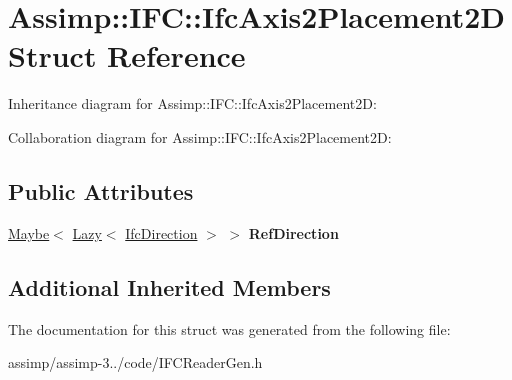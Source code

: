 \hypertarget{struct_assimp_1_1_i_f_c_1_1_ifc_axis2_placement2_d}{\section{Assimp\+:\+:I\+F\+C\+:\+:Ifc\+Axis2\+Placement2\+D Struct Reference}
\label{struct_assimp_1_1_i_f_c_1_1_ifc_axis2_placement2_d}
}


Inheritance diagram for Assimp\+:\+:I\+F\+C\+:\+:Ifc\+Axis2\+Placement2\+D\+:


Collaboration diagram for Assimp\+:\+:I\+F\+C\+:\+:Ifc\+Axis2\+Placement2\+D\+:
\subsection*{Public Attributes}
\begin{DoxyCompactItemize}
\item 
\hypertarget{struct_assimp_1_1_i_f_c_1_1_ifc_axis2_placement2_d_ac90ea24e347c4eed43b75ed7ab83fd2e}{\hyperlink{struct_assimp_1_1_s_t_e_p_1_1_maybe}{Maybe}$<$ \hyperlink{struct_assimp_1_1_s_t_e_p_1_1_lazy}{Lazy}$<$ \hyperlink{struct_assimp_1_1_i_f_c_1_1_ifc_direction}{Ifc\+Direction} $>$ $>$ {\bfseries Ref\+Direction}}\label{struct_assimp_1_1_i_f_c_1_1_ifc_axis2_placement2_d_ac90ea24e347c4eed43b75ed7ab83fd2e}

\end{DoxyCompactItemize}
\subsection*{Additional Inherited Members}


The documentation for this struct was generated from the following file\+:\begin{DoxyCompactItemize}
\item 
assimp/assimp-\/3../code/I\+F\+C\+Reader\+Gen.\+h\end{DoxyCompactItemize}
